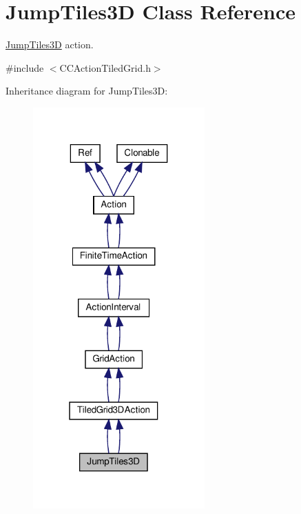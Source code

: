\hypertarget{classJumpTiles3D}{}\section{Jump\+Tiles3D Class Reference}
\label{classJumpTiles3D}


\hyperlink{classJumpTiles3D}{Jump\+Tiles3D} action.  




{\ttfamily \#include $<$C\+C\+Action\+Tiled\+Grid.\+h$>$}



Inheritance diagram for Jump\+Tiles3D\+:
\nopagebreak
\begin{figure}[H]
\begin{center}
\leavevmode
\includegraphics[width=187pt]{classJumpTiles3D__inherit__graph}
\end{center}
\end{figure}


